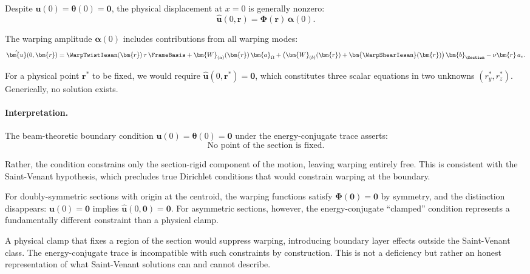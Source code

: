 Despite $\bm{u}(0) = \bm{\theta}(0) = \mathbf{0}$, the physical displacement 
at $x = 0$ is generally nonzero:
\begin{equation}
\hat{\bm{u}}(0, \bm{r}) = \bm{\Phi}(\bm{r})\,\bm{\alpha}(0).
\end{equation}

The warping amplitude $\bm{\alpha}(0)$ includes contributions from all 
warping modes:
\begin{equation}
\hat{\bm{u}}(0, \bm{r}) = \WarpTwistIesan(\bm{r})\,\tau\,\FrameBasis 
+ \bm{W}_{(a)}(\bm{r})\,\bm{a}_\Omega 
+ \big(\bm{W}_{(b)}(\bm{r}) + \bm{\WarpShearIesan}(\bm{r})\big)\,\bm{b}_{\Section}
- \nu\bm{r}\,a_\varepsilon.
\end{equation}

For a physical point $\bm{r}^*$ to be fixed, we would require 
$\hat{\bm{u}}(0, \bm{r}^*) = \mathbf{0}$, which constitutes three scalar 
equations in two unknowns $(r_y^*, r_z^*)$. Generically, no solution exists.

\paragraph{Interpretation.}

The beam-theoretic boundary condition $\bm{u}(0) = \bm{\theta}(0) = \mathbf{0}$ 
under the energy-conjugate trace asserts:
\begin{equation}
\boxed{\text{No point of the section is fixed.}}
\end{equation}

Rather, the condition constrains only the section-rigid component of the 
motion, leaving warping entirely free. This is consistent with the 
Saint-Venant hypothesis, which precludes true Dirichlet conditions that 
would constrain warping at the boundary.

For doubly-symmetric sections with origin at the centroid, the warping 
functions satisfy $\bm{\Phi}(\mathbf{0}) = \mathbf{0}$ by symmetry, and the 
distinction disappears: $\bm{u}(0) = \mathbf{0}$ implies $\hat{\bm{u}}(0, \mathbf{0}) = \mathbf{0}$.
For asymmetric sections, however, the energy-conjugate ``clamped'' condition 
represents a fundamentally different constraint than a physical clamp.

\begin{remark}
A physical clamp that fixes a region of the section would suppress warping, 
introducing boundary layer effects outside the Saint-Venant class. The 
energy-conjugate trace is incompatible with such constraints by construction. 
This is not a deficiency but rather an honest representation of what 
Saint-Venant solutions can and cannot describe.
\end{remark}

